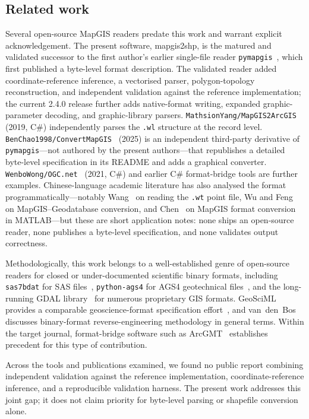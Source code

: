 \documentclass[11pt,a4paper]{article}
\begin{document}
\subsection{Related work}
\label{sec:related}
Several open-source MapGIS readers predate this work and warrant explicit acknowledgement. The present software, mapgis2shp, is the matured and validated successor to the first author's earlier single-file reader \texttt{pymapgis}~\cite{pymapgis2022}, which first published a byte-level format description. The validated reader added coordinate-reference inference, a vectorised parser, polygon-topology reconstruction, and independent validation against the reference implementation; the current 2.4.0 release further adds native-format writing, expanded graphic-parameter decoding, and graphic-library parsers. \texttt{MathsionYang/MapGIS2ArcGIS}~\cite{mathsionyang2019} (2019, C\#) independently parses the \texttt{.wl} structure at the record level. \texttt{BenChao1998/ConvertMapGIS}~\cite{convertmapgis2025} (2025) is an independent third-party derivative of \texttt{pymapgis}---not authored by the present authors---that republishes a detailed byte-level specification in its README and adds a graphical converter. \texttt{WenboWong/OGC.net}~\cite{ogcnet2021} (2021, C\#) and earlier C\# format-bridge tools are further examples. Chinese-language academic literature has also analysed the format programmatically---notably Wang~\cite{wang2013} on reading the \texttt{.wt} point file, Wu and Feng~\cite{wufeng2006} on MapGIS--Geodatabase conversion, and Chen~\cite{chen2000} on MapGIS format conversion in MATLAB---but these are short application notes: none ships an open-source reader, none publishes a byte-level specification, and none validates output correctness.

Methodologically, this work belongs to a well-established genre of open-source readers for closed or under-documented scientific binary formats, including \texttt{sas7bdat} for SAS files~\cite{shotwell2011}, \texttt{python-ags4} for AGS4 geotechnical files~\cite{senanayake2022}, and the long-running GDAL library~\cite{warmerdam2008} for numerous proprietary GIS formats. GeoSciML provides a comparable geoscience-format specification effort~\cite{sen2005}, and van~den~Bos~\cite{vandenbos2014} discusses binary-format reverse-engineering methodology in general terms. Within the target journal, format-bridge software such as ArcGMT~\cite{wright1998} establishes precedent for this type of contribution.

Across the tools and publications examined, we found no public report combining independent validation against the reference implementation, coordinate-reference inference, and a reproducible validation harness. The present work addresses this joint gap; it does not claim priority for byte-level parsing or shapefile conversion alone.
\end{document}

